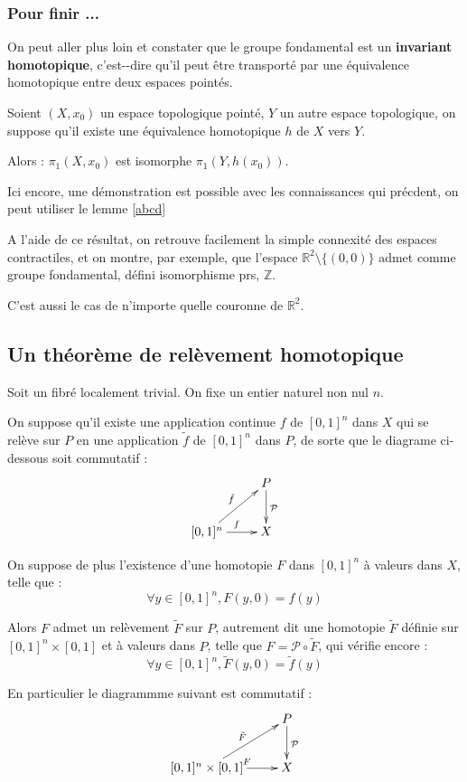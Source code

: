 \subsubsection{Pour finir ...}

On peut aller plus loin et constater que le groupe fondamental est un \textbf{invariant homotopique}, c'est--dire qu'il peut \^etre transport\'e par une \'equivalence homotopique entre deux espaces point\'es.

\begin{prop}
Soient $(X,x_0)$ un espace topologique point\'e, $Y$ un autre espace topologique, on suppose qu'il existe une \'equivalence homotopique $h$ de $X$ vers $Y$.

Alors : $\pi_1(X,x_0)$ est isomorphe  $\pi_1(Y,h(x_0))$.
\end{prop}

Ici encore, une d\'emonstration est possible avec les connaissances qui pr\'ecdent, %
on peut utiliser le lemme \ref{abcd}

\par
A l'aide de ce r\'esultat, on retrouve facilement la simple connexit\'e des espaces contractiles, %
et on montre, par exemple, que l'espace $\mathbb{R}^2\setminus\{(0,0)\}$ admet comme groupe fondamental, d\'efini  isomorphisme prs, $\mathbb{Z}$.

\par
C'est aussi le cas de n'importe quelle couronne de $\mathbb{R}^2$.

\subsection{Un th\'eor\`eme de rel\`evement homotopique}

\begin{theo}
Soit \Fiy un fibr\'e localement trivial.
On fixe un entier naturel non nul $n$.

\par
On suppose qu'il existe une application continue $f$ de $[0,1]^n$ dans $X$ qui se rel\`eve sur $P$ en une application $\tilde{f}$ de $[0,1]^n$ dans $P$, %
de sorte que le diagrame ci-dessous soit commutatif :
\[\xymatrix{ &P \ar[d]^{\mathcal{P}} \\ [0,1]^n \ar[r]^{f} \ar[ru]^{\tilde{f}} & X}\]

On suppose de plus l'existence d'une homotopie $F$ dans $[0,1]^n$ \`a valeurs dans $X$, telle que :
\[\forall y \in [0,1]^n , F(y,0) = f(y)\]

Alors $F$ admet un rel\`evement $\tilde{F}$ sur $P$, autrement dit une homotopie $\tilde{F}$ d\'efinie sur $[0,1]^n \times [0,1]$ et \`a valeurs dans $P$, telle que $F = \mathcal{P} \circ \tilde{F}$, qui v\'erifie encore :
\[\forall y \in [0,1]^n , \tilde{F}(y,0) = \tilde{f}(y)\]

En particulier le diagrammme suivant est commutatif :
\[\xymatrix{ &P \ar[d]^{\mathcal{P}} \\ [0,1]^n \times [0,1] \ar[r]^{F} \ar[ru]^{\tilde{F}} & X}\]
\end{theo}

